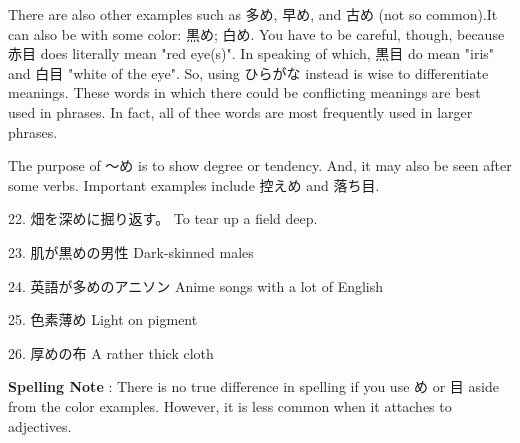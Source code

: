 \par{ There are also other examples such as 多め, 早め, and 古め (not so common).It can also be with some color: 黒め; 白め. You have to be careful, though, because 赤目 does literally mean "red eye(s)". In speaking of which, 黒目 do mean "iris" and 白目 "white of the eye". So, using ひらがな instead is wise to differentiate meanings. These words in which there could be conflicting meanings are best used in phrases. In fact, all of thee words are most frequently used in larger phrases. }

\par{ The purpose of ～め is to show degree or tendency. And, it may also be seen after some verbs. Important examples include 控えめ and 落ち目. }

\par{22. 畑を深めに掘り返す。 \hfill\break
To tear up a field deep. }

\par{23. 肌が黒めの男性 \hfill\break
Dark-skinned males }

\par{24. 英語が多めのアニソン \hfill\break
Anime songs with a lot of English }

\par{25. 色素薄め \hfill\break
Light on pigment }

\par{26. 厚めの布 \hfill\break
A rather thick cloth }

\par{\textbf{Spelling Note }: There is no true difference in spelling if you use め or 目 aside from the color examples. However, it is less common when it attaches to adjectives. }
    